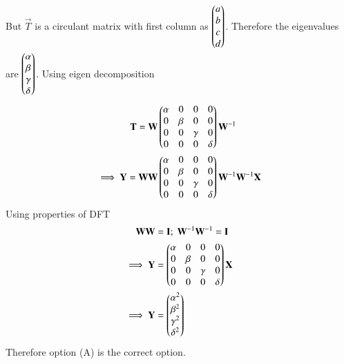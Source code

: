 \documentclass[journal,12pt,twocolumn]{IEEEtran}
\begin{document}
But $\vec{T}$ is a circulant matrix with first column as $\begin{pmatrix}a \\ b \\ c \\ d\end{pmatrix}$. Therefore the eigenvalues are $\begin{pmatrix}\alpha \\ \beta \\ \gamma \\ \delta\end{pmatrix}$. Using eigen decomposition
\begin{align}
    \mathbf{T} = \mathbf{W}&\begin{pmatrix}\alpha & 0 & 0 & 0\\ 0 & \beta & 0 & 0\\ 0 & 0 & \gamma & 0\\ 0 & 0 & 0 & \delta\end{pmatrix} \mathbf{W}^{-1}\\
    \implies \mathbf{Y} = \mathbf{W}\mathbf{W}&\begin{pmatrix}\alpha & 0 & 0 & 0\\ 0 & \beta & 0 & 0\\ 0 & 0 & \gamma & 0\\ 0 & 0 & 0 & \delta\end{pmatrix} \mathbf{W}^{-1}\mathbf{W}^{-1}\mathbf{X}
\end{align}
Using properties of DFT
\begin{align}
    \mathbf{W}\mathbf{W} &= \mathbf{I};\; \mathbf{W}^{-1}\mathbf{W}^{-1} = \mathbf{I}\\
    \implies \mathbf{Y} &= \begin{pmatrix}\alpha & 0 & 0 & 0\\ 0 & \beta & 0 & 0\\ 0 & 0 & \gamma & 0\\ 0 & 0 & 0 & \delta\end{pmatrix} \mathbf{X}\\
    \implies \mathbf{Y} &= \begin{pmatrix}\alpha^2 \\ \beta^2 \\ \gamma^2 \\ \delta^2\end{pmatrix}
\end{align}
Therefore option (A) is the correct option.
\end{document}

